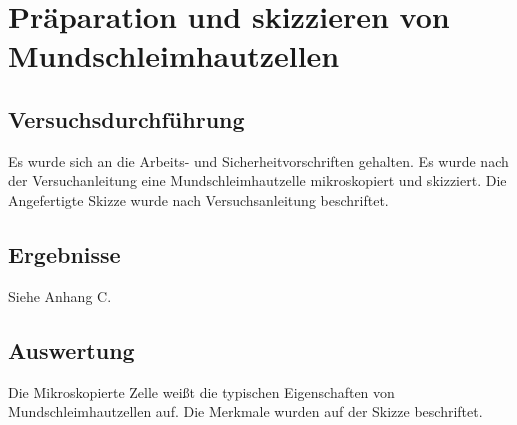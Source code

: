 \section[Mundschleimhautzellen] {Präparation und skizzieren von\\ Mundschleimhautzellen}
\label{sec:Mund}

\subsection{Versuchsdurchführung}
\label{sec:Mund-V}
Es wurde sich an die Arbeits- und Sicherheitvorschriften gehalten.
Es wurde nach der Versuchanleitung eine Mundschleimhautzelle mikroskopiert und skizziert.
Die Angefertigte Skizze wurde nach Versuchsanleitung beschriftet.

\subsection{Ergebnisse}
\label{sec:Mund-E}
Siehe Anhang C.

\subsection{Auswertung}
\label{sec:Mund-A}

Die Mikroskopierte Zelle weißt die typischen Eigenschaften von Mundschleimhautzellen auf.
Die Merkmale wurden auf der Skizze beschriftet.